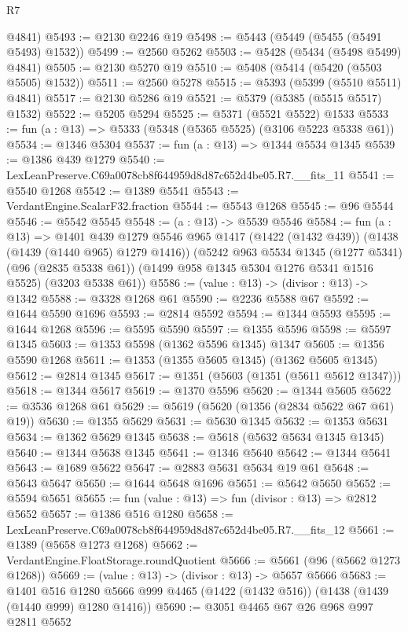 \begin{lexlean}{R7}
\begin{coremodule}
      @4841)
@5493 := @2130 @2246 @19
@5498 := @5443 (@5449 (@5455 (@5491 @5493) @1532))
@5499 := @2560 @5262
@5503 := @5428 (@5434 (@5498 @5499) @4841)
@5505 := @2130 @5270 @19
@5510 := @5408 (@5414 (@5420 (@5503 @5505) @1532))
@5511 := @2560 @5278
@5515 := @5393 (@5399 (@5510 @5511) @4841)
@5517 := @2130 @5286 @19
@5521 := @5379 (@5385 (@5515 @5517) @1532)
@5522 := @5205 @5294
@5525 := @5371 (@5521 @5522) @1533
@5533 := fun (a : @13) => @5333 (@5348 (@5365 @5525) (@3106 @5223 @5338 @61))
@5534 := @1346 @5304
@5537 := fun (a : @13) => @1344 @5534 @1345
@5539 := @1386 @439 @1279
@5540 := LexLeanPreserve.C69a0078cb8f644959d8d87c652d4be05.R7.__fits_11
@5541 := @5540 @1268
@5542 := @1389 @5541
@5543 := VerdantEngine.ScalarF32.fraction
@5544 := @5543 @1268
@5545 := @96 @5544
@5546 := @5542 @5545
@5548 := (a : @13) -> @5539 @5546
@5584 := fun (a : @13) =>
  @1401
    @439
    @1279
    @5546
    @965
    @1417
    (@1422 (@1432 @439))
    (@1438 (@1439 (@1440 @965) @1279 @1416))
    (@5242
      @963
      @5534
      @1345
      (@1277 @5341)
      (@96 (@2835 @5338 @61))
      (@1499 @958 @1345 @5304 @1276 @5341 @1516 @5525)
      (@3203 @5338 @61))
@5586 := (value : @13) -> (divisor : @13) -> @1342
@5588 := @3328 @1268 @61
@5590 := @2236 @5588 @67
@5592 := @1644 @5590 @1696
@5593 := @2814 @5592
@5594 := @1344 @5593
@5595 := @1644 @1268
@5596 := @5595 @5590
@5597 := @1355 @5596
@5598 := @5597 @1345
@5603 := @1353 @5598 (@1362 @5596 @1345) @1347
@5605 := @1356 @5590 @1268
@5611 := @1353 (@1355 @5605 @1345) (@1362 @5605 @1345)
@5612 := @2814 @1345
@5617 := @1351 (@5603 (@1351 (@5611 @5612 @1347)))
@5618 := @1344 @5617
@5619 := @1370 @5596
@5620 := @1344 @5605
@5622 := @3536 @1268 @61
@5629 := @5619 (@5620 (@1356 (@2834 @5622 @67 @61) @19))
@5630 := @1355 @5629
@5631 := @5630 @1345
@5632 := @1353 @5631
@5634 := @1362 @5629 @1345
@5638 := @5618 (@5632 @5634 @1345 @1345)
@5640 := @1344 @5638 @1345
@5641 := @1346 @5640
@5642 := @1344 @5641
@5643 := @1689 @5622
@5647 := @2883 @5631 @5634 @19 @61
@5648 := @5643 @5647
@5650 := @1644 @5648 @1696
@5651 := @5642 @5650
@5652 := @5594 @5651
@5655 := fun (value : @13) => fun (divisor : @13) => @2812 @5652
@5657 := @1386 @516 @1280
@5658 := LexLeanPreserve.C69a0078cb8f644959d8d87c652d4be05.R7.__fits_12
@5661 := @1389 (@5658 @1273 @1268)
@5662 := VerdantEngine.FloatStorage.roundQuotient
@5666 := @5661 (@96 (@5662 @1273 @1268))
@5669 := (value : @13) -> (divisor : @13) -> @5657 @5666
@5683 := @1401
    @516
    @1280
    @5666
    @999
    @4465
    (@1422 (@1432 @516))
    (@1438 (@1439 (@1440 @999) @1280 @1416))
@5690 := @3051 @4465 @67 @26 @968 @997 @2811 @5652

\end{coremodule}
\end{lexlean}

